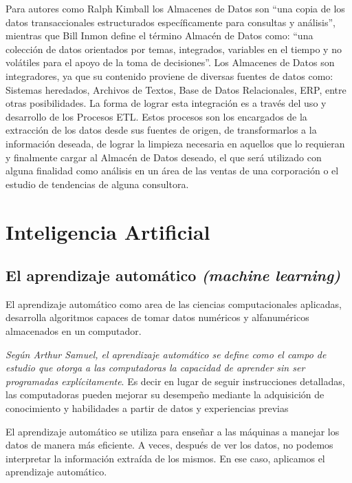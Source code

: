 \vspace{1\baselineskip}
Para autores como Ralph Kimball los Almacenes de Datos son “una copia de los datos transaccionales estructurados específicamente para consultas y análisis”, mientras que Bill Inmon define el término Almacén de Datos como: “una colección
de datos orientados por temas, integrados, variables en el tiempo y no volátiles para el apoyo de la toma de decisiones”. Los Almacenes de Datos son integradores, ya que su contenido proviene de diversas fuentes de datos como:
Sistemas heredados, Archivos de Textos, Base de Datos Relacionales, ERP, entre otras posibilidades. La forma de lograr esta integración es a través del uso y desarrollo de los Procesos ETL. Estos procesos son los encargados de la extracción de los datos desde sus fuentes de origen, de transformarlos a la información deseada, de lograr la limpieza necesaria en aquellos que lo requieran y finalmente cargar al Almacén de Datos deseado, el que será utilizado con alguna finalidad como análisis en un área de las ventas de una
corporación o el estudio de tendencias de alguna
consultora\cite{villarroel2013incorporacion}.

\section{Inteligencia Artificial}
\subsection{El aprendizaje automático \textit{(machine learning)}}

El aprendizaje automático como area de las ciencias computacionales aplicadas,
desarrolla algoritmos capaces de tomar datos numéricos y alfanuméricos
almacenados en un computador\cite{herrera2020prediccion}.

\vspace{1\baselineskip}
\textit{Según Arthur Samuel, el aprendizaje automático se define como el campo de estudio que otorga a las computadoras la capacidad de aprender sin ser programadas explícitamente}\cite{mahesh2020machine}. Es decir en lugar de seguir instrucciones detalladas, las computadoras pueden mejorar su desempeño mediante la adquisición de conocimiento y habilidades a partir de datos y experiencias previas

\vspace{1\baselineskip}
El aprendizaje automático se utiliza para enseñar a las máquinas a manejar los datos de manera más eficiente. A veces, después de ver los datos, no podemos interpretar la información extraída de los mismos. En ese caso, aplicamos el aprendizaje automático.

